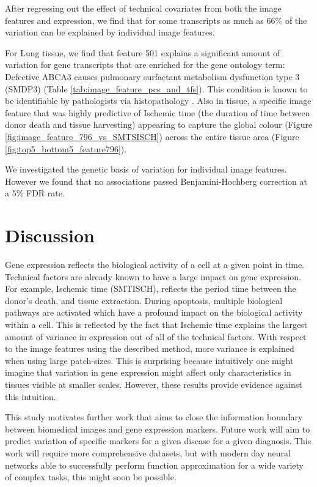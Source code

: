 \documentclass{article}
\begin{document}
After regressing out the effect of technical covariates from both the image features and expression, we find that for some transcripts as much as 66\% of the variation can be explained by individual image features.

For Lung tissue, we find that feature 501 explains a significant amount of variation for gene transcripts that are enriched for the gene ontology term: Defective ABCA3 causes pulmonary surfactant metabolism dysfunction type 3 (SMDP3) (Table \ref{tab:image_feature_pcs_and_tfs}). This condition is known to be identifiable by pathologists via histopathology \cite{surfectant-dysfunction}.  Also in tissue, a specific image feature that was highly predictive of Ischemic time (the duration of time between donor death and tissue harvesting) appearing to capture the global colour (Figure \ref{fig:image_feature_796_vs_SMTSISCH}) across the entire tissue area (Figure \ref{fig:top5_bottom5_feature796}).

We investigated the genetic basis of variation for individual image features. However we found that no associations passed Benjamini-Hochberg correction at a 5\% FDR rate.

\section{Discussion}

Gene expression reflects the biological activity of a cell at a given point in time. Technical factors are already known to have a large impact on gene expression. For example, Ischemic time (SMTISCH), reflects the period time between the donor's death, and tissue extraction. During apoptosis, multiple biological pathways are activated which have a profound impact on the biological activity within a cell. This is reflected by the fact that Ischemic time explains the largest amount of variance in expression out of all of the technical factors. With respect to the image features using the described method, more variance is explained when using large patch-sizes. This is surprising because intuitively one might imagine that variation in gene expression might affect only characteristics in tissues visible at smaller scales. However, these results provide evidence against this intuition.

This study motivates further work that aims to close the information boundary between biomedical images and gene expression markers. Future work will aim to predict variation of specific markers for a given disease for a given diagnosis. This work will require more comprehensive datasets, but with modern day neural networks able to successfully perform function approximation for a wide variety of complex tasks, this might soon be possible.
\end{document}

